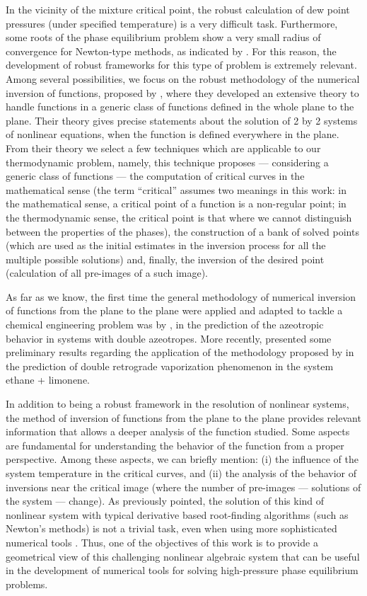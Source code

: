 \documentclass[journal=iecred,manuscript=article]{achemso}
\theoremstyle{definition}
\theoremstyle{remark}
\begin{document}
In the vicinity of the mixture critical point, the robust calculation of dew point pressures (under specified temperature) is a very difficult task. Furthermore, some roots of the phase equilibrium problem show a very small radius of convergence for Newton-type methods, as indicated by \citet{jnsa}. For this reason, the development of robust frameworks for this type of problem is extremely relevant. Among several possibilities, we focus on the robust methodology of the numerical inversion of functions, proposed by \citet{malta}, where they developed an extensive theory to handle functions in a generic class of functions defined in the whole plane to the plane. Their theory gives precise statements about the solution of 2 by 2 systems of nonlinear equations, when the function is defined everywhere in the plane. From their theory we select a few techniques which are applicable to our thermodynamic problem, namely, this technique \citep{malta} proposes --- considering a generic class of functions --- the computation of critical curves in the mathematical sense (the term \enquote{critical} assumes two meanings in this work: in the mathematical sense, a critical point of a function is a non-regular point; in the thermodynamic sense, the critical point is that where we cannot distinguish between the properties of the phases), the construction of a bank of solved points (which are used as the initial estimates in the inversion process for all the multiple possible solutions) and, finally, the inversion of the desired point (calculation of all pre-images of a such image).
 
As far as we know, the first time the general methodology of numerical inversion of functions from the plane to the plane were applied and adapted to tackle a chemical engineering problem was by \citet{canadian}, in the prediction of the azeotropic behavior in systems with double azeotropes. More recently, \citet{ireme} presented some preliminary results regarding the application of the methodology proposed by \citet{malta} in the prediction of double retrograde vaporization phenomenon in the system ethane + limonene.

In addition to being a robust framework in the resolution of nonlinear systems, the method of inversion of functions from the plane to the plane provides relevant information that allows a deeper analysis of the function studied. Some aspects are fundamental for understanding the behavior of the function from a proper perspective. Among these aspects, we can briefly mention: (i) the influence of the system temperature in the critical curves, and (ii) the analysis of the behavior of inversions near the critical image (where the number of pre-images --- solutions of the system --- change). As previously pointed, the solution of this kind of nonlinear system with typical derivative based root-finding algorithms (such as Newton's methods) is not a trivial task, even when using more sophisticated numerical tools \cite{jnsa}. Thus, one of the objectives of this work is to provide a geometrical view of this challenging nonlinear algebraic system that can be useful in the development of numerical tools for solving high-pressure phase equilibrium problems.
\end{document}
